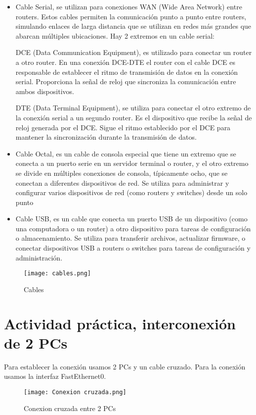\documentclass{article}
\begin{document}
\begin{itemize}
    \item Cable Serial, se utilizan para conexiones WAN (Wide Area Network) entre routers. Estos cables permiten la comunicación punto a punto entre routers, simulando enlaces de larga distancia que se utilizan en redes más grandes que abarcan múltiples ubicaciones. Hay 2 extremos en un cable serial: 

    DCE (Data Communication Equipment), es utilizado para conectar un router a otro router. En una conexión DCE-DTE el router con el cable DCE es responsable de establecer el ritmo de transmisión de datos en la conexión serial. Proporciona la señal de reloj que sincroniza la comunicación entre ambos dispositivos.

    DTE (Data Terminal Equipment), se utiliza para conectar el otro extremo de la conexión serial a un segundo router. Es el dispositivo que recibe la señal de reloj generada por el DCE. Sigue el ritmo establecido por el DCE para mantener la sincronización durante la transmisión de datos.

    \item Cable Octal, es un cable de consola especial que tiene un extremo que se conecta a un puerto serie en un servidor terminal o router, y el otro extremo se divide en múltiples conexiones de consola, típicamente ocho, que se conectan a diferentes dispositivos de red. Se utiliza para administrar y configurar varios dispositivos de red (como routers y switches) desde un solo punto

    \item Cable USB, es un cable que conecta un puerto USB de un dispositivo (como una computadora o un router) a otro dispositivo para tareas de configuración o almacenamiento. Se utiliza para transferir archivos, actualizar firmware, o conectar dispositivos USB a routers o switches para tareas de configuración y administración.
\end{itemize}
\begin{figure}[h]
  \centering
  \texttt{[image: cables.png]}
  \caption{Cables}
\end{figure}
\section{Actividad práctica, interconexión de 2 PCs}

Para establecer la conexión usamos 2 PCs y un cable cruzado. Para la conexión usamos la interfaz FastEthernet0. 
\begin{figure}[h]
  \centering
  \texttt{[image: Conexion cruzada.png]}
  \caption{Conexion cruzada entre 2 PCs}
\end{figure}
\end{document}
